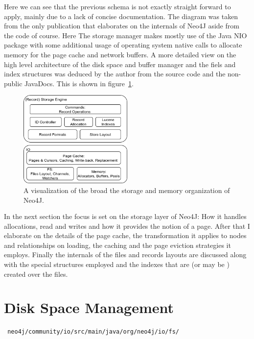 \documentclass[a4paper,10pt]{article}
\begin{document}
Here we can see that the previous schema is not exactly straight forward to apply, mainly due to a lack of concise documentation. The diagram was taken from the only publication that elaborates on the internals of Neo4J aside from the code of course. Here The storage manager makes mostly use of the Java NIO package with some additional usage of operating system native calls to allocate memory for the page cache and network buffers. 
A more detailed view on the high level architecture of the disk space and buffer manager and the fiels and index structures was deduced by the author from the source code and the non-public JavaDocs. This is shown in figure~\ref{N4J_Storage}.

\begin{figure}[htp]\label{N4J_Storage}
 \begin{center}
  \includegraphics[keepaspectratio,width=0.5\textwidth]{img/N4J_Storage.png}
 \end{center}
 \caption{A visualization of the broad the storage and memory organization of Neo4J.} %
\end{figure}

In the next section the focus is set on the storage layer of Neo4J: How it handles allocations, read and writes and how it provides the notion of a page. After that I elaborate on the details of the page cache, the transformation it applies to nodes and relationships on loading, the caching and the page eviction strategies it employs. Finally the internals of the files and records layouts are discussed along with the special structures employed and the indexes that are (or may be ) created over the files.


\section{Disk Space Management}
\texttt{
neo4j/community/io/src/main/java/org/neo4j/io/fs/
} \\
\end{document}
